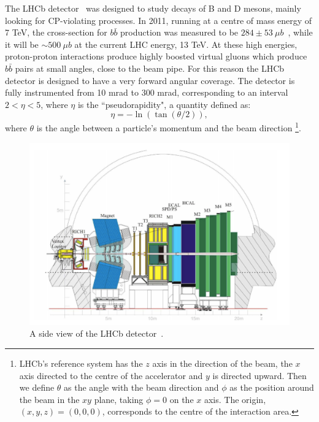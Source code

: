 The LHCb detector~\cite{Alves:2008zz} was designed to study decays of B and D mesons,
mainly looking for CP-violating processes. In 2011, running at a centre of mass energy of 7 TeV, 
the cross-section for $b\bar{b}$ production was measured to be $284 \pm 53 ~\mu b$~\cite{Aaij:2010gn}, 
while it will be $\sim500 ~\mu b$ at the current LHC energy, 13 TeV.
At these high energies, proton-proton interactions produce highly boosted virtual gluons which produce $b\bar{b}$
pairs at small angles, close to the beam pipe. For this reason the LHCb detector is designed to have a very forward angular
coverage. The detector is fully instrumented from 10 mrad to 300 mrad, corresponding to an interval
$2 < \eta < 5$, where $\eta$ is the ``pseudorapidity", a quantity defined as:
\begin{equation}
\label{pseudorap}
\eta = - \ln(\tan(\theta/2)),
\end{equation}
where $\theta$ is the angle between a particle's momentum and the beam direction
\footnote{LHCb's reference system has the $z$ axis in the direction of the beam, the $x$ axis directed to
the centre of the accelerator and $y$ is directed upward. Then we define $\theta$ as the angle with the beam
direction and $\phi$ as the position around the beam in the $xy$ plane, taking $\phi = 0$ on the $x$ axis.
The origin, $(x,y,z)=(0,0,0)$, corresponds to the centre of the interaction area.}.

\begin{figure}[h]
\includegraphics[width=1.\linewidth]{Detector/figs/LHCb_official.png}
\caption{A side view of the LHCb detector~\cite{Alves:2008zz}.}
\label{fig:lhcb}
\end{figure}

